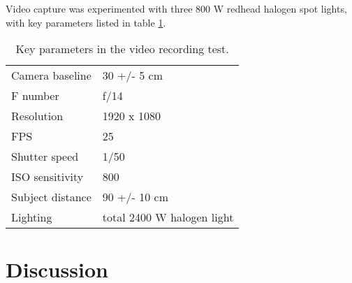 



%
%
%

Video capture was experimented with three 800 W redhead halogen spot lights, with key parameters listed in table \ref{tab:samplevideoparams}.

\begin{table}[h]
	\centering
	\begin{tabular}{l l}
		Camera baseline & 30 +/- 5 cm\\
		F number & f/14\\
		Resolution & 1920 x 1080\\
		FPS & 25\\
		Shutter speed & 1/50\\
		ISO sensitivity & 800\\
		Subject distance & 90 +/- 10 cm\\
		Lighting & total 2400 W halogen light\\
	\end{tabular}
	\caption{
		Key parameters in the video recording test. %
	}
	\label{tab:samplevideoparams}
\end{table}

\clearpage

\section{Discussion} \label{sec:discussion}

